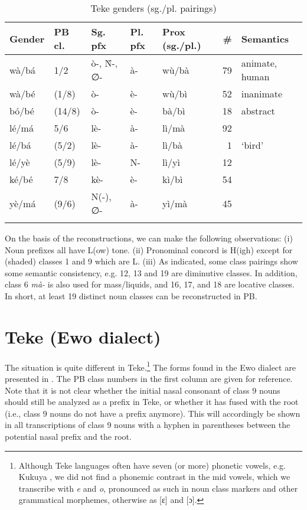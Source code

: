 \documentclass[output=paper,,modfonts,nonflat]{langsci/langscibook}
\begin{document}
\begin{table}[p]
\caption{Teke genders (sg./pl. pairings)}
\label{table3}
\begin{small}
\begin{tabular}{lllllrl}
  \lsptoprule
Gender	&	PB cl.	&	Sg. pfx	&	Pl. pfx	&	Prox (sg./pl.)	&	\#	&	Semantics	\\	
\midrule
wà/bá	&	1/2	&	ò-, Ǹ-, ∅-	&	  à-	&	wù/bà	&	79	&	animate, human	\\	
wà/bé	&	(1/8)	&	ò-	&	  è-	&	wù/bì	&	52	&	inanimate	\\	
bó/bé	&	(14/8)	&	ò-	&	  è-	&	bà/bì	&	18	&	abstract	\\	
lé/má	&	5/6	&	lè-	&	  à-	&	lì/mà	&	92	&		\\	
lé/bá	&	(5/2)	&	lè-	&	  à-	&	lì/bà	&	1	&	`bird’ 	\\	
lé/yè	&	(5/9)	&	lè-	&	  N-	&	lì/yì	&	12	&		\\	
ké/bé	&	7/8	&	kè-	&	  è-	&	kì/bì	&	54	&		\\	
yè/má	&	(9/6)	&	N(-), ∅-	&	  à-	&	yì/mà	&	45	&		\\	
  \lspbottomrule
\end{tabular}
\end{small}
\end{table}


On the basis of the reconstructions, we can make the following observations: (i) Noun prefixes all have L(ow) tone. (ii) Pronominal concord is H(igh) except for (shaded) classes 1 and 9 which are L. (iii) As indicated, some class pairings show some semantic consistency, e.g. 12, 13 and 19 are diminutive classes. In addition, class 6 \textit{mà-} is also used for mass/liquids, and 16, 17, and 18 are locative classes. In short, at least 19 distinct noun classes can be reconstructed in PB.

 
\section{Teke (Ewo dialect)} 
\label{3-Teke}

The situation is quite different in Teke.\footnote{Although Teke languages often have seven (or more) phonetic vowels, e.g. Kukuya \citep{Paulian1975}, we did not find a phonemic contrast in the mid vowels, which we transcribe with \emph{e} and \emph{o}, pronounced as such in noun class markers and other grammatical morphemes, otherwise as [ɛ] and [ɔ].} The forms found in the Ewo dialect are presented in . The PB class numbers in the first column are given for reference. Note that it is not clear whether the initial nasal consonant of class 9 nouns should still be analyzed as a prefix in Teke, or whether it has fused with the root (i.e., class 9 nouns do not have a prefix anymore). This will accordingly be shown in all transcriptions of class 9 nouns with a hyphen in parentheses between the potential nasal prefix and the root.
\end{document}
